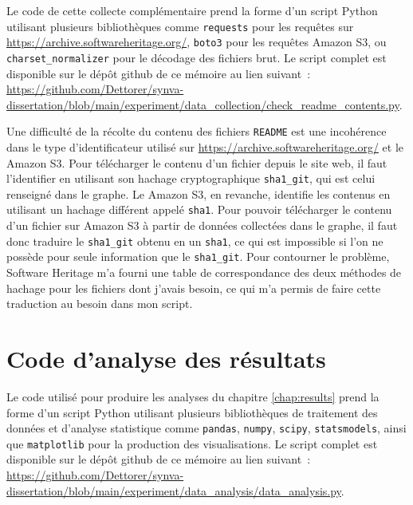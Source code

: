 Le code de cette collecte complémentaire prend la forme d'un script Python utilisant plusieurs bibliothèques
comme \texttt{requests} pour les requêtes sur \url{https://archive.softwareheritage.org/}, \texttt{boto3} pour
les requêtes Amazon S3, ou \texttt{charset\_normalizer} pour le décodage des fichiers brut. Le script complet
est disponible sur le dépôt \gls{github} de ce mémoire au lien suivant :
\url{https://github.com/Dettorer/synva-dissertation/blob/main/experiment/data_collection/check_readme_contents.py}.


Une difficulté de la récolte du contenu des fichiers \texttt{README} est une incohérence dans le type
d'identificateur utilisé sur \url{https://archive.softwareheritage.org/} et le  Amazon S3. Pour
télécharger le contenu d'un fichier depuis le site web, il faut l'identifier en utilisant son hachage
cryptographique \texttt{sha1\_git}, qui est celui renseigné dans le graphe. Le  Amazon S3, en
revanche, identifie les contenus en utilisant un hachage différent appelé \texttt{sha1}. Pour pouvoir
télécharger le contenu d'un fichier sur Amazon S3 à partir de données collectées dans le graphe, il faut donc
traduire le \texttt{sha1\_git} obtenu en un \texttt{sha1}, ce qui est impossible si l'on ne possède pour seule
information que le \texttt{sha1\_git}. Pour contourner le problème, Software Heritage m'a fourni une table de
correspondance des deux méthodes de hachage pour les fichiers dont j'avais besoin, ce qui m'a permis de faire
cette traduction au besoin dans mon script.

\section{Code d'analyse des résultats}
\label{app:analysis.py}

Le code utilisé pour produire les analyses du chapitre \ref{chap:results} prend la forme d'un script Python
utilisant plusieurs bibliothèques de traitement des données et d'analyse statistique comme \texttt{pandas},
\texttt{numpy}, \texttt{scipy}, \texttt{statsmodels}, ainsi que \texttt{matplotlib} pour la production des
visualisations. Le script complet est disponible sur le dépôt \gls{github} de ce mémoire au lien suivant :
\url{https://github.com/Dettorer/synva-dissertation/blob/main/experiment/data_analysis/data_analysis.py}.

